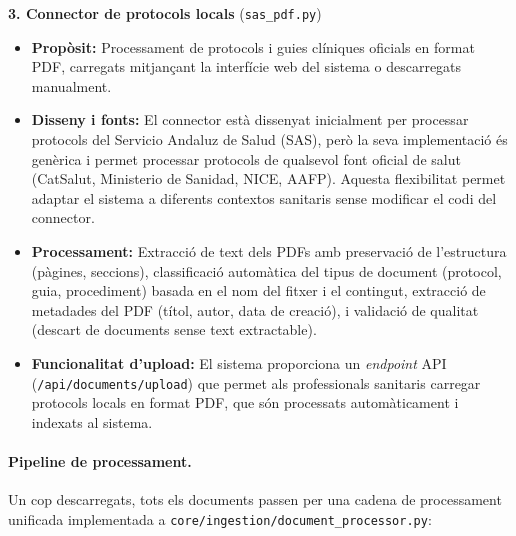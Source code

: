 \documentclass[CAT]{TFUOC}%
\begin{document}
\textbf{3. Connector de protocols locals} (\texttt{sas\_pdf.py})

\begin{itemize}
    \item \textbf{Propòsit:} Processament de protocols i guies clíniques oficials en format PDF, carregats mitjançant la interfície web del sistema o descarregats manualment.
    
    \item \textbf{Disseny i fonts:} El connector està dissenyat inicialment per processar protocols del Servicio Andaluz de Salud (SAS), però la seva implementació és genèrica i permet processar protocols de qualsevol font oficial de salut (CatSalut, Ministerio de Sanidad, NICE, AAFP). Aquesta flexibilitat permet adaptar el sistema a diferents contextos sanitaris sense modificar el codi del connector.
    
    \item \textbf{Processament:} Extracció de text dels PDFs amb preservació de l'estructura (pàgines, seccions), classificació automàtica del tipus de document (protocol, guia, procediment) basada en el nom del fitxer i el contingut, extracció de metadades del PDF (títol, autor, data de creació), i validació de qualitat (descart de documents sense text extractable).
    
    \item \textbf{Funcionalitat d'upload:} El sistema proporciona un \textit{endpoint} API (\texttt{/api/documents/upload}) que permet als professionals sanitaris carregar protocols locals en format PDF, que són processats automàticament i indexats al sistema.
\end{itemize}

\paragraph{Pipeline de processament.}

Un cop descarregats, tots els documents passen per una cadena de processament unificada implementada a \texttt{core/ingestion/document\_processor.py}:
\end{document}
